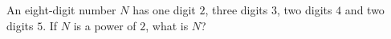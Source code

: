 An eight-digit number $N$ has one digit $2$, three digits $3$, two digits $4$ and two digits $5$. If $N$ is a power of $2$, what is $N$?
